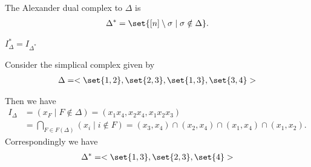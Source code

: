 \begin{definition}
    The Alexander dual complex to $\Delta$ is
    \begin{align*}
        \Delta^* = \set{ [n] \setminus \sigma \mid \sigma \notin \Delta}.
    \end{align*}
\end{definition}

\begin{lemma}
    $I_\Delta^* = I_{\Delta^*}$
\end{lemma}

\begin{example}
    Consider the simplical complex given by
    \begin{align*}
        \Delta = < \set{ 1,2 } , \set{ 2,3 } , \set{ 1,3 } , \set{ 3,4 } >
    \end{align*}
    \begin{center}
    \end{center}
    Then we have
    \begin{align*}
        I_\Delta &= ( x_F \mid F \notin \Delta ) = ( x_1  x_4, x_2 x_4 , x_1 x_2 x_3 )\\
        &=  \bigcap_{F \in F(\Delta)} (x_i \mid i \notin F) = ( x_3, x_4 ) \cap ( x_2 , x_4 ) \cap ( x_1 , x_4) \cap ( x_1 , x_2 ).
    \end{align*}
    Correspondingly we have
    \begin{align*}
        \Delta^* = < \set{ 1,3 } , \set{ 2,3 } , \set{ 4 } >
    \end{align*}
    \begin{center}
\end{center}
\end{example}
